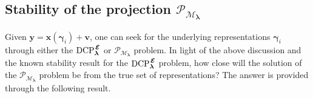 \documentclass[10pt,journal]{IEEEtran}
\def\x{{\mathbf x}}
\def\v{{\mathbf v}}
\def\y{{\mathbf y}}
\def\D{{\mathbf D}}
\def\M{{\mathcal{M}}}
\def\P{{\mathcal{P}}}
\def\gama{{\boldsymbol \gamma}}
\def\lamda{{\boldsymbol \lambda}}
\def\vps{{\bm{\mathbf{\mathcal{E}}}}}
\def\DCPE{{\text{DCP}_\lamda^{\hspace{0.04cm} \vps}}}
\def\MEP{{\text{M}\vps\text{P}}}
\def\PM{{\P_{\M_\lamda}}}
\theoremstyle{plain}
\newtheorem{thm}{Theorem} %
\theoremstyle{definition}
\begin{document}
\subsection{Stability of the projection $\PM$}

Given $\y = \x(\gama_i) + \v$, one can seek for the underlying representations $\gama_i$ through either the $\DCPE$ or $\PM$ problem. In light of the above discussion and the known stability result for the $\DCPE$ problem, how close will the solution of the $\PM$ problem be from the true set of representations? The answer is provided through the following result.


\end{document}
